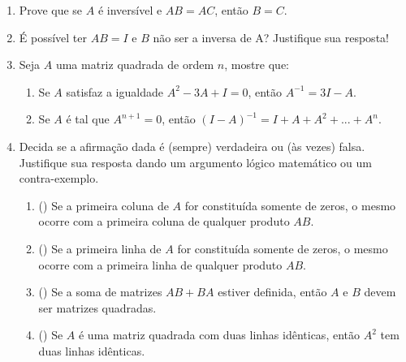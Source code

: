 \documentclass{report}
\begin{document}
\begin{Exercise}
\begin{enumerate}

\item \label{1lista23} Prove que se $A$ é inversível e $AB=AC$,
então $B=C$.



\item \label{1lista24} É possível ter $AB=I$ e $B$ não ser a
inversa de A? Justifique sua resposta!




\item \label{1lista25}  Seja $A$ uma matriz quadrada de ordem $n$,
mostre que:
\begin{enumerate}
    \item Se $A$ satisfaz a igualdade $ A^{2}-3A+I=0$, então
    $A^{-1}=3I-A$.
    \item Se $A$ é tal que $A^{n+1}=0$, então
    $(I-A)^{-1}=I+A+A^{2}+...+A^{n}.$
\end{enumerate}



\item \label{1lista26} Decida se a afirmação dada é (sempre)
verdadeira ou (às vezes) falsa. Justifique sua resposta dando um
argumento lógico matemático ou um contra-exemplo.

\begin{enumerate}
\item  (\quad ) Se a primeira coluna de $A$ for constituída
somente de zeros, o mesmo ocorre com a primeira coluna de qualquer
produto $AB$.

\item  (\quad ) Se a primeira linha de $A$ for constituída somente
de zeros, o mesmo ocorre com a primeira linha de qualquer produto
$AB$.

\item  (\quad ) Se a soma de matrizes $AB+BA$ estiver definida,
então $A$ e $B$ devem ser matrizes quadradas.

\item  (\quad ) Se $A$ é uma matriz quadrada com duas linhas
idênticas, então $A^{2}$ tem duas linhas idênticas.


\end{enumerate}
\end{enumerate}
\end{Exercise}
\end{document}

